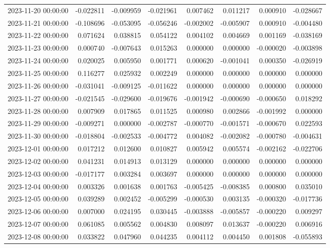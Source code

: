 \begin{tabular}{lrrrrrrr}
2023-11-20 00:00:00 & -0.022811 & -0.009959 & -0.021961 & 0.007462 & 0.011217 & 0.000910 & -0.028667 \\
2023-11-21 00:00:00 & -0.108696 & -0.053095 & -0.056246 & -0.002002 & -0.005907 & 0.000910 & -0.004480 \\
2023-11-22 00:00:00 & 0.071624 & 0.038815 & 0.054122 & 0.004102 & 0.004669 & 0.001169 & -0.038169 \\
2023-11-23 00:00:00 & 0.000740 & -0.007643 & 0.015263 & 0.000000 & 0.000000 & -0.000020 & -0.003898 \\
2023-11-24 00:00:00 & 0.020025 & 0.005950 & 0.001771 & 0.000620 & -0.001041 & 0.000350 & -0.026919 \\
2023-11-25 00:00:00 & 0.116277 & 0.025932 & 0.002249 & 0.000000 & 0.000000 & 0.000000 & 0.000000 \\
2023-11-26 00:00:00 & -0.031041 & -0.009125 & -0.011622 & 0.000000 & 0.000000 & 0.000000 & 0.000000 \\
2023-11-27 00:00:00 & -0.021545 & -0.029600 & -0.019676 & -0.001942 & -0.000690 & -0.000650 & 0.018292 \\
2023-11-28 00:00:00 & 0.007909 & 0.017865 & 0.011525 & 0.000980 & 0.002866 & -0.001992 & 0.000000 \\
2023-11-29 00:00:00 & -0.009271 & 0.000000 & -0.002787 & -0.000770 & -0.001571 & -0.000670 & 0.022593 \\
2023-11-30 00:00:00 & -0.018804 & -0.002533 & -0.004772 & 0.004082 & -0.002082 & -0.000780 & -0.004631 \\
2023-12-01 00:00:00 & 0.017212 & 0.012600 & 0.010827 & 0.005942 & 0.005574 & -0.002162 & -0.022706 \\
2023-12-02 00:00:00 & 0.041231 & 0.014913 & 0.013129 & 0.000000 & 0.000000 & 0.000000 & 0.000000 \\
2023-12-03 00:00:00 & -0.017177 & 0.003284 & 0.003697 & 0.000000 & 0.000000 & 0.000000 & 0.000000 \\
2023-12-04 00:00:00 & 0.003326 & 0.001638 & 0.001763 & -0.005425 & -0.008385 & 0.000800 & 0.035010 \\
2023-12-05 00:00:00 & 0.039289 & 0.002452 & -0.005299 & -0.000530 & 0.003135 & -0.000320 & -0.017736 \\
2023-12-06 00:00:00 & 0.007000 & 0.024195 & 0.030445 & -0.003888 & -0.005857 & -0.000220 & 0.009297 \\
2023-12-07 00:00:00 & 0.061085 & 0.005562 & 0.004830 & 0.008097 & 0.013637 & -0.000220 & 0.006916 \\
2023-12-08 00:00:00 & 0.033822 & 0.047960 & 0.044235 & 0.004112 & 0.004450 & 0.001808 & -0.055893 \\

\end{tabular}
